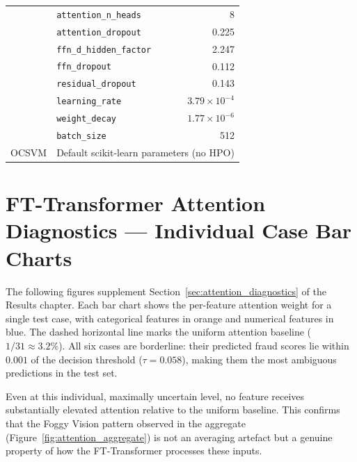 \begin{minipage}{\linewidth}
\begin{tabular}{l l r}
  & \texttt{attention\_n\_heads} & 8 \\
  & \texttt{attention\_dropout} & 0.225 \\
  & \texttt{ffn\_d\_hidden\_factor} & 2.247 \\
  & \texttt{ffn\_dropout} & 0.112 \\
  & \texttt{residual\_dropout} & 0.143 \\
  & \texttt{learning\_rate} & $3.79 \times 10^{-4}$ \\
  & \texttt{weight\_decay} & $1.77 \times 10^{-6}$ \\
  & \texttt{batch\_size} & 512 \\
\midrule
OCSVM & \multicolumn{2}{l}{Default scikit-learn parameters (no HPO)} \\
\bottomrule
\end{tabular}
\end{minipage}\par\medskip

\clearpage

\section{FT-Transformer Attention Diagnostics --- Individual Case Bar Charts}
\label{appendixB}

The following figures supplement Section~\ref{sec:attention_diagnostics} of the Results chapter. Each bar chart shows the per-feature attention weight for a single test case, with categorical features in orange and numerical features in blue. The dashed horizontal line marks the uniform attention baseline ($1/31 \approx 3.2\%$). All six cases are borderline: their predicted fraud scores lie within $0.001$ of the decision threshold ($\tau = 0.058$), making them the most ambiguous predictions in the test set.

Even at this individual, maximally uncertain level, no feature receives substantially elevated attention relative to the uniform baseline. This confirms that the Foggy Vision pattern observed in the aggregate (Figure~\ref{fig:attention_aggregate}) is not an averaging artefact but a genuine property of how the FT-Transformer processes these inputs.

